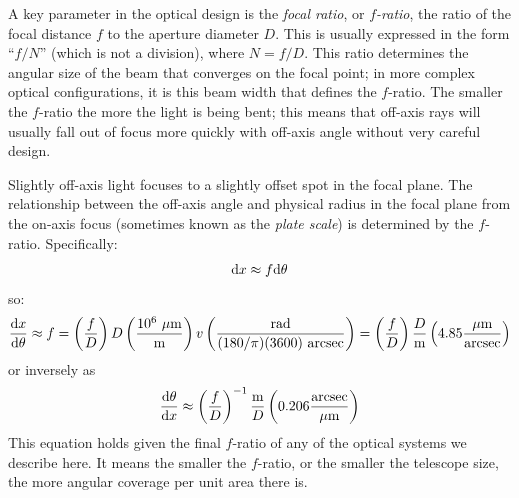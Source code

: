 A key parameter in the optical design is the {\it focal ratio}, or
{\it $f$-ratio}, the ratio of the focal distance $f$ to the aperture
diameter $D$. This is usually expressed in the form ``$f/N$'' (which
is not a division), where $N = f/D$. This ratio determines the angular
size of the beam that converges on the focal point; in more complex
optical configurations, it is this beam width that defines the
$f$-ratio. The smaller the $f$-ratio the more the light is being bent;
this means that off-axis rays will usually fall out of focus more
quickly with off-axis angle without very careful design.

Slightly off-axis light focuses to a slightly offset spot in the focal
plane. The relationship between the off-axis angle and physical radius
in the focal plane from the on-axis focus (sometimes known as the {\it
plate scale}) is determined by the $f$-ratio. Specifically:
\begin{equation}
{\rm d}x \approx f {\rm d}\theta
\end{equation}
so:
\begin{equation}
\frac{{\rm d}x}{{\rm d}\theta} \approx f
= \left(\frac{f}{D}\right) D
\left(\frac{10^6~\mu{\rm m}}{{\rm m}}\right)v
\left(\frac{\rm rad}{(180/\pi)(3600)~{\rm arcsec}}\right)
= \left(\frac{f}{D}\right) \frac{D}{{\rm m}}
\left(4.85 \frac{\mu{\rm m}}{\rm arcsec}\right)
\end{equation}
or inversely as 
\begin{equation}
\label{eq:platescale}
\frac{{\rm d}\theta}{{\rm d}x} \approx 
\left(\frac{f}{D}\right)^{-1} \frac{{\rm m}}{D}
\left(0.206\frac{\rm arcsec}{\mu{\rm m}}\right)
\end{equation}
This equation holds given the final $f$-ratio of any of the optical
systems we describe here. It means the smaller the $f$-ratio, or the
smaller the telescope size, the more angular coverage per unit area
there is.

